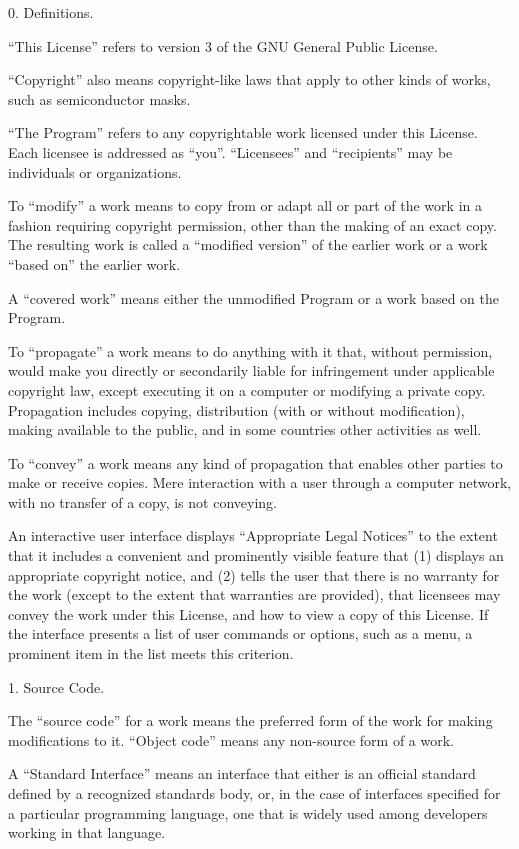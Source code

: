   0. Definitions.

  ``This License'' refers to version 3 of the GNU General Public License.

  ``Copyright'' also means copyright-like laws that apply to other kinds of
works, such as semiconductor masks.

  ``The Program'' refers to any copyrightable work licensed under this
License.  Each licensee is addressed as ``you''.  ``Licensees'' and
``recipients'' may be individuals or organizations.

  To ``modify'' a work means to copy from or adapt all or part of the work
in a fashion requiring copyright permission, other than the making of an
exact copy.  The resulting work is called a ``modified version'' of the
earlier work or a work ``based on'' the earlier work.

  A ``covered work'' means either the unmodified Program or a work based
on the Program.

  To ``propagate'' a work means to do anything with it that, without
permission, would make you directly or secondarily liable for
infringement under applicable copyright law, except executing it on a
computer or modifying a private copy.  Propagation includes copying,
distribution (with or without modification), making available to the
public, and in some countries other activities as well.

  To ``convey'' a work means any kind of propagation that enables other
parties to make or receive copies.  Mere interaction with a user through
a computer network, with no transfer of a copy, is not conveying.

  An interactive user interface displays ``Appropriate Legal Notices''
to the extent that it includes a convenient and prominently visible
feature that (1) displays an appropriate copyright notice, and (2)
tells the user that there is no warranty for the work (except to the
extent that warranties are provided), that licensees may convey the
work under this License, and how to view a copy of this License.  If
the interface presents a list of user commands or options, such as a
menu, a prominent item in the list meets this criterion.

  1. Source Code.

  The ``source code'' for a work means the preferred form of the work
for making modifications to it.  ``Object code'' means any non-source
form of a work.

  A ``Standard Interface'' means an interface that either is an official
standard defined by a recognized standards body, or, in the case of
interfaces specified for a particular programming language, one that
is widely used among developers working in that language.

